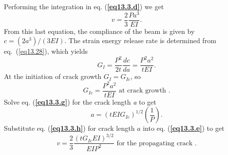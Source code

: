 \documentclass{AeroStructure-ERJohnson}
\begin{document}
\begin{example*}
\noindent Performing the integration in eq. (\textbf{\ref{eq13.3.d}}) we get
\begin{equation}
v=\frac{2}{3} \frac{P a^{3}}{E I}. \label{eq13.3.e}\tag{e}
\end{equation}
From this last equation, the compliance of the beam is given by $c=(2 a^{3}) /(3 E I)$. The strain energy release rate is determined from eq.~(\ref{eq13.28}), which yields
\begin{equation}
G_{I}=\frac{P^{2}}{2 t} \frac{d c}{d a}=\frac{P^{2} a^{2}}{t E I}. \label{eq13.3.f}\tag{f}
\end{equation}
At the initiation of crack growth $G_{I}=G_{I c}$, so
\begin{equation}
G_{I c}=\frac{P^{2} a^{2}}{t E I} \text { at crack growth }. \label{eq13.3.g}\tag{g}
\end{equation}
Solve eq. (\textbf{\ref{eq13.3.g}}) for the crack length \textit{a} to get
\begin{equation}
a=\left(t E I G_{I c}\right)^{1 / 2}\left(\frac{1}{P}\right). \label{eq13.3.h}\tag{h}
\end{equation}
Substitute eq. (\textbf{\ref{eq13.3.h}}) for crack length $a$ into eq. (\textbf{\ref{eq13.3.e}}) to get
\begin{equation}
v=\frac{2}{3} \frac{\left(t G_{I c} E I\right)^{3 / 2}}{E I P^{2}} \text { for the propagating crack }. \label{eq13.3.i}\tag{i}
\end{equation}


\end{example*}
\end{document}

